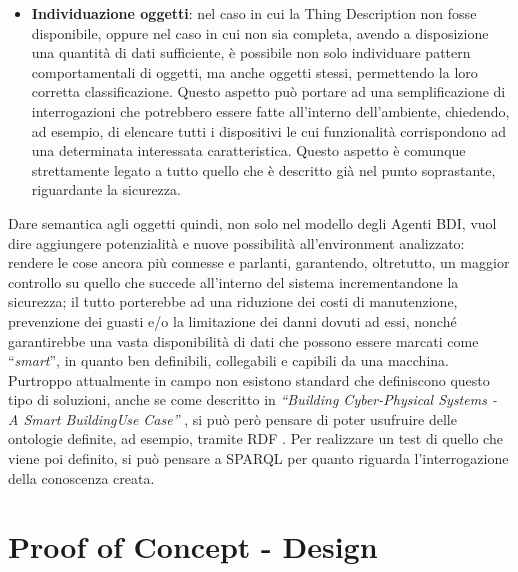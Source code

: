 \documentclass[12pt,a4paper,openright,oneside]{report}
\newcommand{\quotes}[1]{``#1''}
\begin{document}
\begin{itemize}
	\item \textbf{Individuazione oggetti}: nel caso in cui la Thing Description non fosse disponibile, oppure nel caso in cui non sia completa, avendo a disposizione una quantità di dati sufficiente, è possibile non solo individuare pattern comportamentali di oggetti, ma anche oggetti stessi, permettendo la loro corretta classificazione. Questo aspetto può portare ad una semplificazione di interrogazioni che potrebbero essere fatte all'interno dell'ambiente, chiedendo, ad esempio, di elencare tutti i dispositivi le cui funzionalità corrispondono ad una determinata interessata caratteristica. Questo aspetto è comunque strettamente legato a tutto quello che è descritto già nel punto soprastante, riguardante la sicurezza.
	
\end{itemize}

Dare semantica agli oggetti quindi, non solo nel modello degli Agenti BDI, vuol dire aggiungere potenzialità e nuove possibilità all'environment analizzato: rendere le cose ancora più connesse e parlanti, garantendo, oltretutto, un maggior controllo su quello che succede all'interno del sistema incrementandone la sicurezza; il tutto porterebbe ad una riduzione dei costi di manutenzione, prevenzione dei guasti e/o la limitazione dei danni dovuti ad essi, nonché garantirebbe una vasta disponibilità di dati che possono essere marcati come \quotes{\textit{smart}}, in quanto ben definibili, collegabili e capibili da una macchina.\\


Purtroppo attualmente in campo non esistono standard che definiscono questo tipo di soluzioni, anche se come descritto in \textit{\quotes{Building Cyber-Physical Systems - A Smart BuildingUse Case}} \cite{smartbuilding}, si può però pensare di poter usufruire delle ontologie definite, ad esempio, tramite RDF \cite{rdf}. Per realizzare un test di quello che viene poi definito, si può pensare a SPARQL \cite{sparql} per quanto riguarda l'interrogazione della conoscenza creata.



\clearpage{\pagestyle{empty}\cleardoublepage}
\chapter{Proof of Concept - Design}           %
\lhead[\fancyplain{}{\bfseries\thepage}]{\fancyplain{}{\bfseries\rightmark}}  
\end{document}
